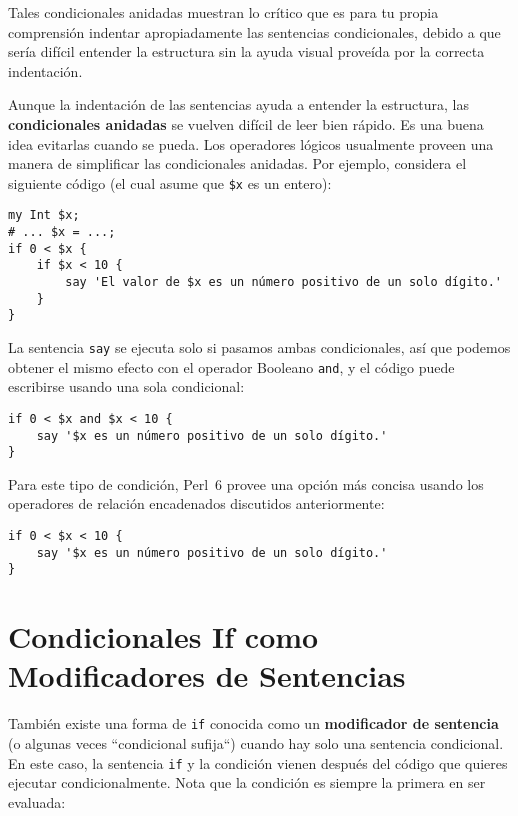 Tales condicionales anidadas muestran lo crítico que es 
para tu propia comprensión indentar apropiadamente las
sentencias condicionales, debido a que sería difícil 
entender la estructura sin la ayuda visual
proveída por la correcta indentación.

Aunque la indentación de las sentencias ayuda
a entender la estructura, las {\bf condicionales anidadas}
se vuelven difícil de leer bien rápido. Es una buena
idea evitarlas cuando se pueda. Los operadores lógicos
usualmente proveen una manera de simplificar las
condicionales anidadas. Por ejemplo, considera
el siguiente código (el cual asume que \verb|$x| es
un entero):

\begin{verbatim}
my Int $x;
# ... $x = ...;
if 0 < $x {
    if $x < 10 {
        say 'El valor de $x es un número positivo de un solo dígito.'
    }
}
\end{verbatim}
%
La sentencia {\tt say} se ejecuta solo si pasamos ambas condicionales,
así que podemos obtener el mismo efecto con el operador Booleano {\tt and},
y el código puede escribirse usando una sola condicional:

\begin{verbatim}
if 0 < $x and $x < 10 {
    say '$x es un número positivo de un solo dígito.'
}
\end{verbatim}

Para este tipo de condición, Perl~6 provee una opción más concisa
usando los operadores de relación encadenados discutidos 
anteriormente:

\begin{verbatim}
if 0 < $x < 10 {
    say '$x es un número positivo de un solo dígito.'
}
\end{verbatim}

\section{Condicionales If como Modificadores de Sentencias}
 
 

También existe una forma de {\tt if} conocida como un
{\bf modificador de sentencia} (o algunas veces ``condicional sufija``)
cuando hay solo una sentencia condicional. En este caso, 
la sentencia {\tt if} y la condición vienen después del 
código que quieres ejecutar condicionalmente. Nota que la 
condición es siempre la primera en ser evaluada:

